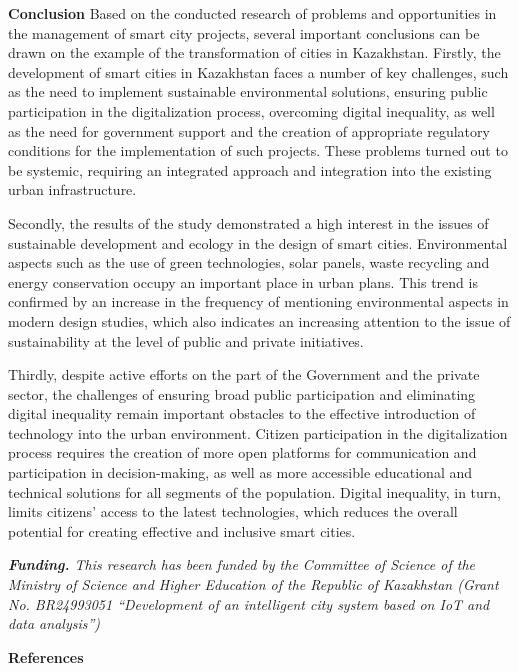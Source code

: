 {\bfseries Conclusion} Based on the conducted research of problems and
opportunities in the management of smart city projects, several
important conclusions can be drawn on the example of the transformation
of cities in Kazakhstan. Firstly, the development of smart cities in
Kazakhstan faces a number of key challenges, such as the need to
implement sustainable environmental solutions, ensuring public
participation in the digitalization process, overcoming digital
inequality, as well as the need for government support and the creation
of appropriate regulatory conditions for the implementation of such
projects. These problems turned out to be systemic, requiring an
integrated approach and integration into the existing urban
infrastructure.

Secondly, the results of the study demonstrated a high interest in the
issues of sustainable development and ecology in the design of smart
cities. Environmental aspects such as the use of green technologies,
solar panels, waste recycling and energy conservation occupy an
important place in urban plans. This trend is confirmed by an increase
in the frequency of mentioning environmental aspects in modern design
studies, which also indicates an increasing attention to the issue of
sustainability at the level of public and private initiatives.

Thirdly, despite active efforts on the part of the Government and the
private sector, the challenges of ensuring broad public participation
and eliminating digital inequality remain important obstacles to the
effective introduction of technology into the urban environment. Citizen
participation in the digitalization process requires the creation of
more open platforms for communication and participation in
decision-making, as well as more accessible educational and technical
solutions for all segments of the population. Digital inequality, in
turn, limits citizens'{} access to the latest
technologies, which reduces the overall potential for creating effective
and inclusive smart cities.

\emph{{\bfseries Funding.} This research has been funded by the Committee
of Science of the Ministry of Science and Higher Education of the
Republic of Kazakhstan (Grant No. BR24993051 ``Development of an
intelligent city system based on IoT and data analysis'')}

{\bfseries References}

